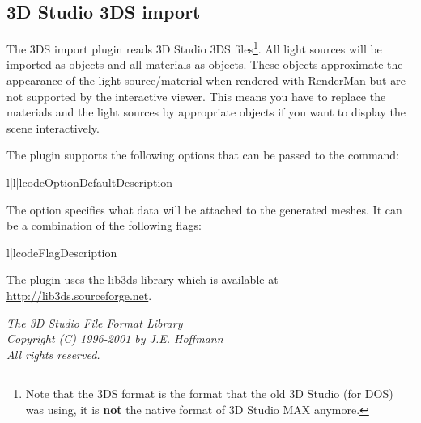 
\subsection{3D Studio 3DS import}

The 3DS import plugin reads 3D Studio 3DS files\footnote{Note that the
3DS format is the format that the old 3D Studio (for DOS) was using,
it is {\bf not} the native format of 3D Studio MAX anymore.}.
All light sources will be imported as  objects
and all materials as  objects. These objects
approximate the appearance of the light source/material when rendered
with RenderMan but are not supported by the interactive viewer. This
means you have to replace the materials and the light sources by
appropriate objects if you want to display the scene interactively.


The plugin supports the following options that can be passed to
the  command:

\begin{tableiii}{l|l|l}{code}{Option}{Default}{Description}
\end{tableiii}

The  option specifies what data will be attached to the generated
meshes. It can be a combination of the following flags:

\begin{tableii}{l|l}{code}{Flag}{Description}
\end{tableii}

\begin{notice}[note]
The plugin uses the lib3ds library which is available at \url{http://lib3ds.sourceforge.net}.

{\em The 3D Studio File Format Library}\\
{\em Copyright (C) 1996-2001 by J.E. Hoffmann}\\
{\em All rights reserved.}\\
\end{notice}

